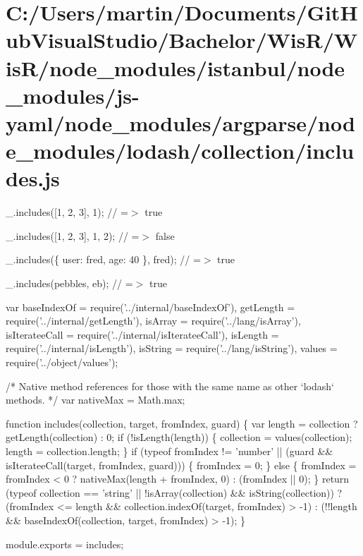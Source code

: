 \hypertarget{_c_1_2_users_2martin_2_documents_2_git_hub_visual_studio_2_bachelor_2_wis_r_2_wis_r_2node_module7b2065432211f72c2f31445444d4568a}{}\section{C\+:/\+Users/martin/\+Documents/\+Git\+Hub\+Visual\+Studio/\+Bachelor/\+Wis\+R/\+Wis\+R/node\+\_\+modules/istanbul/node\+\_\+modules/js-\/yaml/node\+\_\+modules/argparse/node\+\_\+modules/lodash/collection/includes.\+js}
\+\_\+.\+includes(\mbox{[}1, 2, 3\mbox{]}, 1); // =$>$ true

\+\_\+.\+includes(\mbox{[}1, 2, 3\mbox{]}, 1, 2); // =$>$ false

\+\_\+.\+includes(\{ \textquotesingle{}user\textquotesingle{}\+: \textquotesingle{}fred\textquotesingle{}, \textquotesingle{}age\textquotesingle{}\+: 40 \}, \textquotesingle{}fred\textquotesingle{}); // =$>$ true

\+\_\+.\+includes(\textquotesingle{}pebbles\textquotesingle{}, \textquotesingle{}eb\textquotesingle{}); // =$>$ true


\begin{DoxyCodeInclude}
var baseIndexOf = require(\textcolor{stringliteral}{'../internal/baseIndexOf'}),
    getLength = require(\textcolor{stringliteral}{'../internal/getLength'}),
    isArray = require(\textcolor{stringliteral}{'../lang/isArray'}),
    isIterateeCall = require(\textcolor{stringliteral}{'../internal/isIterateeCall'}),
    isLength = require(\textcolor{stringliteral}{'../internal/isLength'}),
    isString = require(\textcolor{stringliteral}{'../lang/isString'}),
    values = require(\textcolor{stringliteral}{'../object/values'});

\textcolor{comment}{/* Native method references for those with the same name as other `lodash` methods. */}
var nativeMax = Math.max;

\textcolor{keyword}{function} includes(collection, target, fromIndex, guard) \{
  var length = collection ? getLength(collection) : 0;
  \textcolor{keywordflow}{if} (!isLength(length)) \{
    collection = values(collection);
    length = collection.length;
  \}
  \textcolor{keywordflow}{if} (typeof fromIndex != \textcolor{stringliteral}{'number'} || (guard && isIterateeCall(target, fromIndex, guard))) \{
    fromIndex = 0;
  \} \textcolor{keywordflow}{else} \{
    fromIndex = fromIndex < 0 ? nativeMax(length + fromIndex, 0) : (fromIndex || 0);
  \}
  \textcolor{keywordflow}{return} (typeof collection == \textcolor{stringliteral}{'string'} || !isArray(collection) && isString(collection))
    ? (fromIndex <= length && collection.indexOf(target, fromIndex) > -1)
    : (!!length && baseIndexOf(collection, target, fromIndex) > -1);
\}

module.exports = includes;
\end{DoxyCodeInclude}
 